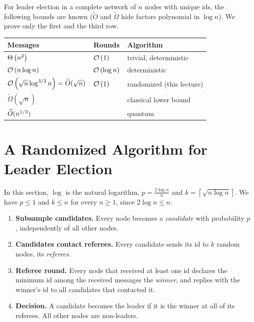For leader election in a complete network of $n$ nodes with unique ids, the following bounds are
known ($\widetilde{O}$ and $\widetilde{\Omega}$ hide factors polynomial in $\log n$). We prove only
the first and the third row.
\begin{center}
    \begin{tabular}{lll}
        Messages                                           & Rounds            & Algorithm                \\
        \hline
        $\Theta\left(n^2\right)$                                      & $\mathcal{O}\left(1\right)$        & trivial, deterministic   \\
        $\mathcal{O}\left(n \log n\right)$                                  & $\mathcal{O}\left(\log n\right)$   & deterministic            \\
        $\mathcal{O}\left(\sqrt{n} \log^{3/2} n\right) = \widetilde{O}(\sqrt{n})$ & $\mathcal{O}\left(1\right)$ & randomized (this lecture) \\
        $\widetilde{\Omega}(\sqrt{n})$                     &                   & classical lower bound    \\
        $\widetilde{O}(n^{1/3})$                  &                   & quantum                  \\
    \end{tabular}
\end{center}

\section{A Randomized Algorithm for Leader Election}

In this section, $\log$ is the natural logarithm, $p = \frac{2 \log n}{n}$ and
$k = \left\lceil \sqrt{n \log n} \right\rceil$. We have $p \leq 1$ and $k \leq n$ for every
$n \geq 1$, since $2 \log n \leq n$.
\begin{enumerate}
    \item \textbf{Subsample candidates.} Every node becomes a \emph{candidate} with probability $p$,
          independently of all other nodes.
    \item \textbf{Candidates contact referees.} Every candidate sends its id to $k$ random nodes,
          its \emph{referees}.
    \item \textbf{Referee round.} Every node that received at least one id declares the minimum id
          among the received messages the \emph{winner}, and replies with the winner's id to all
          candidates that contacted it.
    \item \textbf{Decision.} A candidate becomes the leader if it is the winner at all of its
          referees. All other nodes are non-leaders.
\end{enumerate}

